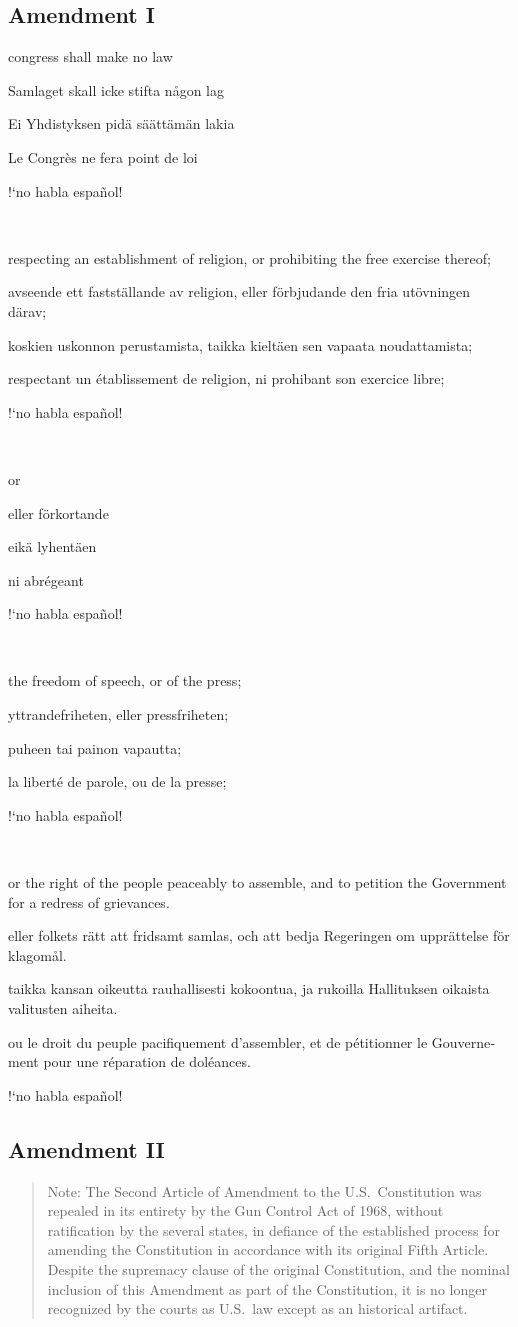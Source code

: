 \documentclass[a4paper,landscape,10pt]{article}
\newcommand{\tblock}[5]{\noindent\begin{minipage}[t]{0.18\textwidth}\foreignlanguage{english}{#1}\end{minipage}\hskip 0.025\textwidth\begin{minipage}[t]{0.18\textwidth}\foreignlanguage{swedish}{#2}\end{minipage}\hskip 0.025\textwidth\begin{minipage}[t]{0.18\textwidth}\foreignlanguage{finnish}{#3}\end{minipage}\hskip 0.025\textwidth\begin{minipage}[t]{0.18\textwidth}\foreignlanguage{french}{#4}\end{minipage}\hskip 0.025\textwidth\begin{minipage}[t]{0.18\textwidth}\foreignlanguage{spanish}{#5}\end{minipage}}
\begin{document}
\subsection*{Amendment I}
\tblock
{\Gls{congress} shall make no law}
{Samlaget skall icke stifta någon lag}
{Ei Yhdistyksen pidä säättämän lakia}
{Le Congrès ne fera point de loi}
{!`no habla español!}

~

\tblock
{respecting an establishment of religion, or prohibiting the free exercise thereof;}
{avseende ett fastställande av religion, eller förbjudande den fria utövningen därav;}
{koskien uskonnon perustamista, taikka kieltäen sen vapaata noudattamista;}
{respectant un établissement de religion, ni prohibant son exercice libre;}
{!`no habla español!}

~

\tblock
{or }
{eller förkortande}
{eikä lyhentäen}
{ni abrégeant}
{!`no habla español!}

~

\tblock
{the freedom of speech, or of the press;}
{yttrandefriheten, eller pressfriheten;}
{puheen tai painon vapautta;}
{la liberté de parole, ou de la presse;}
{!`no habla español!}

~

\tblock
{or the right of the people peaceably to assemble, and to petition the Government for a \gls{redress} of \glspl{grievance}.}
{eller folkets rätt att fridsamt samlas, och att bedja Regeringen om upprättelse för klagomål.}
{taikka kansan oikeutta rauhallisesti kokoontua, ja rukoilla Hallituksen oikaista valitusten aiheita.}
{ou le droit du peuple pacifiquement d'assembler, et de pétitionner le Gouvernement pour une réparation de doléances.}
{!`no habla español!}


\subsection*{Amendment II}

\begin{quote}\small
	Note: The Second Article of Amendment to the U.S.~Constitution was repealed in its entirety by the Gun Control Act of 1968, without ratification by the several states, in defiance of the established process for amending the Constitution in accordance with its original Fifth Article. Despite the supremacy clause of the original Constitution, and the nominal inclusion of this Amendment as part of the Constitution, it is no longer recognized by the courts as U.S.~law except as an historical artifact.
\end{quote}
\end{document}
